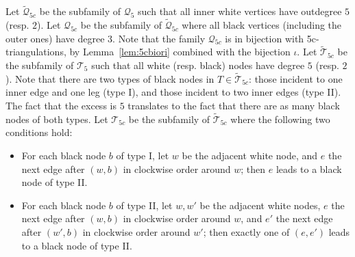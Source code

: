 \documentclass[letter]{amsart}
\numberwithin{theo}{section}
\theoremstyle{remark}
\def\cQ{\mathcal{Q}}
\def\cT{\mathcal{T}}
\def\cQfc{\cQ_{5c}}
\def\cTfc{\cT_{5c}}
\def\wcQfc{\widetilde{\cQ}_{5c}}
\def\wcTfc{\widetilde{\cT}_{5c}}
\begin{document}
Let $\wcQfc$ be the subfamily of $\cQ_{5}$ such that all inner white vertices have outdegree $5$ (resp. $2$). Let $\cQfc$ be the subfamily of $\wcQfc$ where all black vertices (including the outer ones) have degree $3$. Note that the family $\cQfc$ is in bijection with   5c-triangulations, by Lemma~\ref{lem:5cbiori} combined with the bijection $\iota$. Let $\wcTfc$ be the subfamily of $\cT_{5}$ such that all white (resp. black) nodes have degree $5$ (resp. $2$).  Note that there are two types of black nodes in $T\in\wcTfc$: those incident to one inner edge and one leg (type I), and those incident to two inner edges (type II).  The fact that the excess is $5$ translates to the fact that there are as many black nodes of both types. 
Let $\cTfc$ be the subfamily of $\wcTfc$ where the following two conditions hold:
\begin{itemize}
\item[{\bf C1}:]
For each black node $b$ of type I, let $w$ be the adjacent white node, and $e$ the next edge after $(w,b)$ in clockwise order around $w$; then $e$ leads to a black node of type II.  
\item[{\bf C2}:]
For each black node $b$ of type II, let $w,w'$ be the adjacent white nodes, $e$ the next edge after $(w,b)$ in clockwise order around $w$, and $e'$ the next edge after $(w',b)$ in clockwise order around $w'$; then exactly one of $(e,e')$ leads to a black node of type II. 
\end{itemize} 
\end{document}
